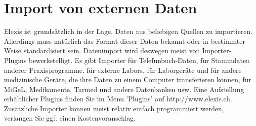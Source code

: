 \section{Import von externen Daten }
Elexis ist grundsätzlich in der Lage, Daten aus beliebigen Quellen zu importieren. Allerdings muss natürlich das Format dieser Daten bekannt oder in bestimmter Weise standardisiert sein. Datenimport wird deswegen meist von Importer-Plugins bewerkstelligt. Es gibt Importer für Telefunbuch-Daten, für Stammdaten anderer Praxisprogramme, für externe Labors, für Laborgeräte und für andere medizinische Geräte, die ihre Daten zu einem Computer transferieren können, für MiGeL, Medikamente, Tarmed und andere Datenbanken usw. Eine Aufstellung erhältlicher Plugins finden Sie im Menu 'Plugins' auf http://www.elexis.ch. Zusätzliche Importer können meist relativ einfach programmiert werden, verlangen Sie ggf. einen Kostenvoranschlag.

\medskip

